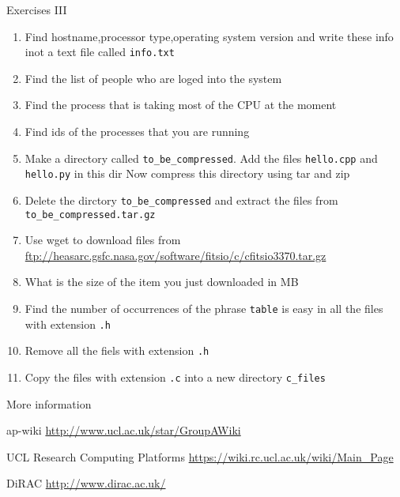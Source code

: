 \documentclass{beamer}
\begin{document}
\begin{frame}{Exercises III}
  \fontsize{8pt}{8}\selectfont
  \begin{enumerate}
    \item Find hostname,processor type,operating system version and write these info inot a text file called \texttt{info.txt}
    \item Find the list of people who are loged into the system
    \item Find the process that is taking most of the CPU at the moment
    \item Find ids of the processes that you are running
    \item Make a directory called \texttt{to\_be\_compressed}. Add the files \texttt{hello.cpp} and \texttt{hello.py} in this dir
    Now compress this directory using tar and zip
    \item Delete the dirctory \texttt{to\_be\_compressed} and extract the files from \texttt{to\_be\_compressed.tar.gz}
    \item Use wget to download  files from \url{ftp://heasarc.gsfc.nasa.gov/software/fitsio/c/cfitsio3370.tar.gz}
    \item What is the size of the item you just downloaded in MB
    \item Find the number of occurrences of the phrase \texttt{table} is easy in all the files with extension \texttt{.h}
    \item Remove all the fiels with extension \texttt{.h}
    \item Copy the files with extension \texttt{.c} into a new directory \texttt{c\_files}
  \end{enumerate}
\end{frame}

\begin{frame}{More information}
  \begin{block}{ap-wiki}
    \url{http://www.ucl.ac.uk/star/GroupAWiki}
  \end{block}

  \begin{block}{UCL Research Computing Platforms}
    \url{https://wiki.rc.ucl.ac.uk/wiki/Main_Page}
  \end{block}

  \begin{block}{DiRAC}
    \url{http://www.dirac.ac.uk/}
  \end{block}
\end{frame}
\end{document}
